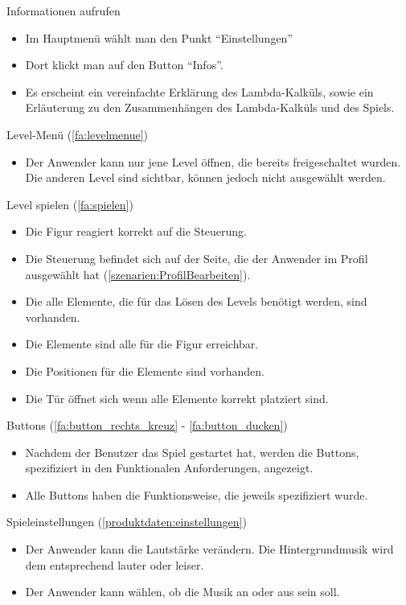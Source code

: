 \documentclass{scrartcl}
\begin{document}
\begin{telist}
	\item{Informationen aufrufen} \label{szenarien:infomartionen_aufrufen}
	\begin{itemize}
		\item Im Hauptmenü wählt man den Punkt \enquote{Einstellungen}
		\item Dort klickt man auf den Button \enquote{Infos}.
		\item Es erscheint ein vereinfachte Erklärung des Lambda-Kalküls, sowie ein Erläuterung zu den Zusammenhängen des Lambda-Kalküls und des Spiels.
	\end{itemize}
	
	\item Level-Menü (\ref{fa:levelmenue})
	\begin{itemize}
		\item Der Anwender kann nur jene Level öffnen, die bereits freigeschaltet wurden. Die anderen Level sind sichtbar, können jedoch nicht ausgewählt werden.
	\end{itemize}
	
	\item Level spielen (\ref{fa:spielen})
	\begin{itemize}
		\item Die Figur reagiert korrekt auf die Steuerung.
		\item Die Steuerung befindet sich auf der Seite, die der Anwender im Profil ausgewählt hat (\ref{szenarien:ProfilBearbeiten}).
		\item Die alle Elemente, die für das Lösen des Levels benötigt werden, sind vorhanden.
		\item Die Elemente sind alle für die Figur erreichbar.
		\item Die Positionen für die Elemente sind vorhanden.
		\item Die Tür öffnet sich wenn alle Elemente korrekt platziert sind.
	\end{itemize}
	
	\item Buttons (\ref{fa:button_rechts_kreuz} - \ref{fa:button_ducken})
	\begin{itemize}
		\item Nachdem der Benutzer das Spiel gestartet hat, werden die Buttons, spezifiziert in den Funktionalen Anforderungen, angezeigt.
		\item Alle Buttons haben die Funktionsweise, die jeweils spezifiziert wurde.
	\end{itemize}
	
	\item Spieleinstellungen (\ref{produktdaten:einstellungen})
	\begin{itemize}
		\item Der Anwender kann die Lautstärke verändern. Die Hintergrundmusik wird dem entsprechend lauter oder leiser.
		\item Der Anwender kann wählen, ob die Musik an oder aus sein soll.
	\end{itemize}
	

\end{telist}
\end{document}
